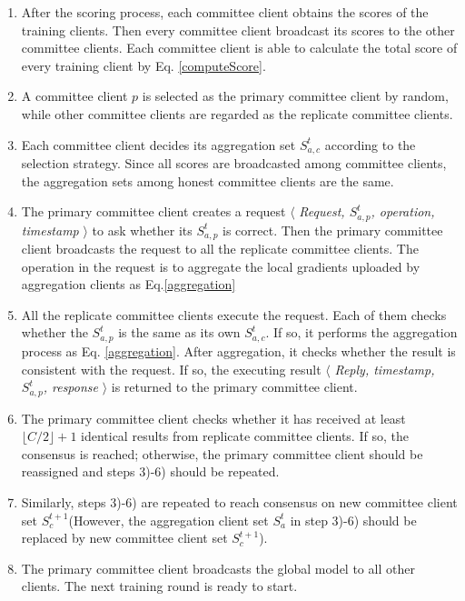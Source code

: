 \documentclass[10pt,journal,compsoc]{IEEEtran}
\begin{document}
\begin{enumerate}
\item After the scoring process, each committee client obtains the scores of the training clients. Then every committee client broadcast its scores to the other committee clients. Each committee client is able to calculate the total score of every training client by Eq. \eqref{computeScore}.
\item A committee client $p$ is selected as the primary committee client by random, while other committee clients are regarded as the replicate committee clients. 
\item Each committee client decides its aggregation set $S_{a,c}^t$ according to the selection strategy. Since all scores are broadcasted among committee clients, the aggregation sets among honest committee clients are the same. 
\item The primary committee client creates a request $\langle$ \textit{Request, $S_{a,p}^t$, operation, timestamp} $\rangle$ to ask whether its $S_{a,p}^t$ is correct. Then the primary committee client broadcasts the request to all the replicate committee clients. The operation in the request is to aggregate the local gradients uploaded by aggregation clients as Eq.\eqref{aggregation}
\item All the replicate committee clients execute the request. Each of them checks whether the $S_{a,p}^t$ is the same as its own $S_{a,c}^t$. If so, it performs the aggregation process as Eq. \eqref{aggregation}. After aggregation, it checks whether the result is consistent with the request. If so, the executing result $\langle$ \textit{Reply, timestamp, $S_{a,p}^t$, response} $\rangle$ is returned to the primary committee client.
\item The primary committee client checks whether it has received at least $\lfloor C/2 \rfloor + 1$ identical results from replicate committee clients. If so, the consensus is reached; otherwise, the primary committee client should be reassigned and steps 3)-6) should be repeated.
\item Similarly, steps 3)-6) are repeated to reach consensus on new committee client set $S_c^{t+1}$(However, the aggregation client set $S_a^t$ in step 3)-6) should be replaced by new committee client set $S_c^{t+1}$).
\item The primary committee client broadcasts the global model to all other clients. The next training round is ready to start.  
\end{enumerate} 
\end{document}
